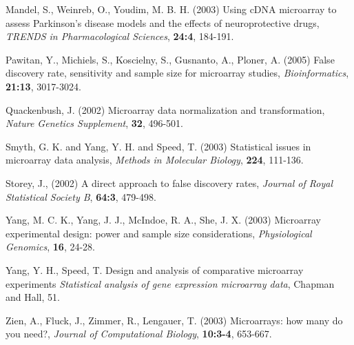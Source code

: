 \documentclass[12pt]{article}
\begin{document}
\begin{thebibliography}{}
 Mandel, S.,  Weinreb,
  O., Youdim, M. B. H. (2003) Using cDNA microarray to assess
  Parkinson's disease models and the effects of neuroprotective
  drugs, {\it TRENDS in Pharmacological Sciences}, {\bf 24:4},
  184-191.

 Pawitan, Y., Michiels, S., Koscielny, S., Gusnanto, A., Ploner, A. (2005)
  False discovery rate, sensitivity and sample size for microarray studies,
  {\it Bioinformatics}, {\bf 21:13}, 3017-3024.

 Quackenbush, J. (2002)
  Microarray data normalization and transformation, {\it Nature Genetics Supplement}, {\bf 32}, 496-501.

 Smyth, G. K. and Yang, Y. H. and Speed, T. (2003)
  Statistical issues in microarray data analysis, {\it Methods in Molecular Biology}, {\bf 224}, 111-136.

 Storey, J., (2002)
  A direct approach to false discovery rates, {\it Journal of Royal
  Statistical Society B}, {\bf 64:3}, 479-498.

 Yang, M. C. K., Yang,
  J. J., McIndoe, R. A., She, J. X. (2003) Microarray experimental
  design: power and sample size considerations, {\it Physiological
  Genomics}, {\bf 16}, 24-28.

 Yang, Y. H., Speed, T.
  {Design and analysis of comparative microarray experiments \it
  Statistical analysis of gene expression microarray data}, {Chapman
  and Hall}, 51.

 Zien, A., Fluck, J.,
  Zimmer, R., Lengauer, T. (2003) Microarrays: how many do you
  need?, {\it Journal of Computational Biology}, {\bf 10:3-4},
  653-667.

\end{thebibliography}
\end{document}
